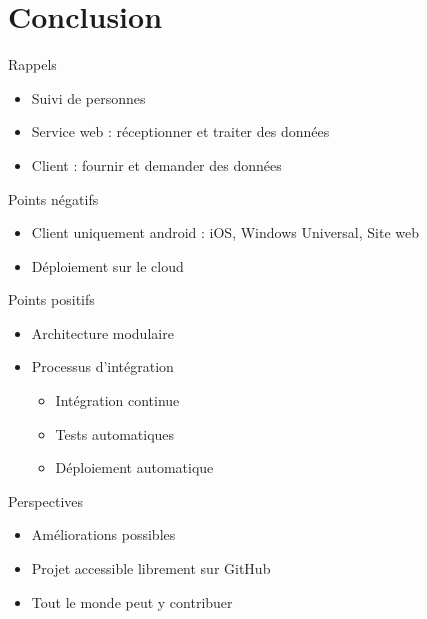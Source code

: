 \documentclass{beamer} %
\begin{document}
  \section{Conclusion}
  \begin{frame}{\secname}
      \begin{block}{Rappels}
        \begin{itemize}
          \item Suivi de personnes
          \item Service web : réceptionner et traiter des données
          \item Client : fournir et demander des données
        \end{itemize}
      \end{block}

      \pause

      \begin{alertblock}{Points négatifs}
        \begin{itemize}
          \item Client uniquement android : iOS, Windows Universal, Site web
          \item Déploiement sur le cloud
        \end{itemize}
      \end{alertblock}

  \end{frame}

  \begin{frame}{\secname}
    \begin{exampleblock}{Points positifs}
        \begin{itemize}
          \item Architecture modulaire
          \item Processus d'intégration
          \begin{itemize}
            \item Intégration continue
            \item Tests automatiques
            \item Déploiement automatique
          \end{itemize}
        \end{itemize}
      \end{exampleblock}

      \pause

      \begin{block}{Perspectives}
        \begin{itemize}
          \item Améliorations possibles
          \item Projet accessible librement sur GitHub
          \item Tout le monde peut y contribuer
        \end{itemize}
      \end{block}
  \end{frame}
\end{document}

